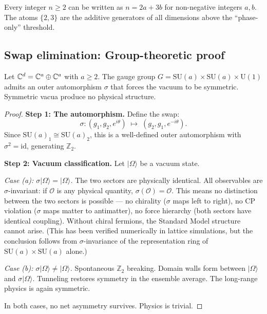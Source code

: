 \begin{remark}
Every integer $n \geq 2$ can be written as $n = 2a + 3b$ for non-negative integers $a, b$. The atoms $\{2, 3\}$ are the additive generators of all dimensions above the ``phase-only'' threshold.
\end{remark}

\subsection{Swap elimination: Group-theoretic proof}

\begin{theorem}
\label{thm:swap}
Let $\mathbb{C}^d = \mathbb{C}^a \oplus \mathbb{C}^a$ with $a \geq 2$. The gauge group $G = \text{SU}(a) \times \text{SU}(a) \times \text{U}(1)$ admits an outer automorphism $\sigma$ that forces the vacuum to be symmetric. Symmetric vacua produce no physical structure.
\end{theorem}

\begin{proof}
\textbf{Step 1: The automorphism.}
Define the swap:
\begin{equation}
\sigma: (g_1, g_2, e^{i\theta}) \;\mapsto\; (g_2, g_1, e^{-i\theta}).
\end{equation}
Since $\text{SU}(a)_1 \cong \text{SU}(a)_2$, this is a well-defined outer automorphism with $\sigma^2 = \text{id}$, generating $\mathbb{Z}_2$.

\textbf{Step 2: Vacuum classification.}
Let $|\Omega\rangle$ be a vacuum state.

\emph{Case (a): $\sigma|\Omega\rangle = |\Omega\rangle$.}
The two sectors are physically identical. All observables are $\sigma$-invariant: if $\mathcal{O}$ is any physical quantity, $\sigma(\mathcal{O}) = \mathcal{O}$. This means no distinction between the two sectors is possible --- no chirality ($\sigma$ maps left to right), no CP violation ($\sigma$ maps matter to antimatter), no force hierarchy (both sectors have identical coupling). Without chiral fermions, the Standard Model structure cannot arise. (This has been verified numerically in lattice simulations, but the conclusion follows from $\sigma$-invariance of the representation ring of $\text{SU}(a) \times \text{SU}(a)$ alone.)

\emph{Case (b): $\sigma|\Omega\rangle \neq |\Omega\rangle$.}
Spontaneous $\mathbb{Z}_2$ breaking. Domain walls form between $|\Omega\rangle$ and $\sigma|\Omega\rangle$. Tunneling restores symmetry in the ensemble average. The long-range physics is again symmetric.

In both cases, no net asymmetry survives. Physics is trivial.
\end{proof}


